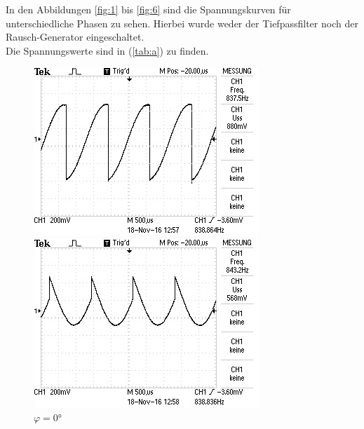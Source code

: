 In den Abbildungen \eqref{fig:1} bis \eqref{fig:6} sind die Spannungskurven für unterschiedliche Phasen
zu sehen. Hierbei wurde weder der Tiefpassfilter noch der Rausch-Generator eingeschaltet. \\
Die Spannungswerte sind in (\ref{tab:a}) zu finden. \\

\newpage

\begin{figure}[!h]
\begin{minipage}[t]{0.3\textwidth}
\includegraphics[width=\textwidth]{Bilder/Rausch0.jpg}
\caption{$\varphi = 0\si{\degree}$}
\label{fig:7}
\end{minipage}
\hspace{10pt}
\vspace{5pt}
\begin{minipage}[t]{0.3\textwidth}
\includegraphics[width=\textwidth]{Bilder/Rausch120.jpg}

\end{minipage}
\end{figure}
